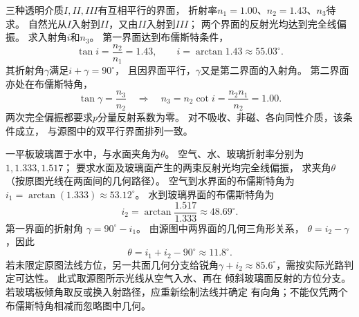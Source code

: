\problemtext 三种透明介质$I,II,III$有互相平行的界面，
折射率$n_1=1.00$、$n_2=1.43$、$n_3$待求。
自然光从$I$入射到$II$，又由$II$入射到$III$；
两个界面的反射光均达到完全线偏振。
求入射角$i$和$n_3$。
\workings
第一界面达到布儒斯特条件，
\[
 \tan i=\frac{n_2}{n_1}=1.43,\qquad
 \boxed{i=\arctan1.43\approx55.03^\circ}.
\]
其折射角$\gamma$满足$i+\gamma=90^\circ$，
且因界面平行，$\gamma$又是第二界面的入射角。
第二界面亦处在布儒斯特角，
\[
 \tan\gamma=\frac{n_3}{n_2}
 \quad\Longrightarrow\quad
 n_3=n_2\cot i
 =\frac{n_2n_1}{n_2}=\boxed{1.00}.
\]
\crosscheck 两次完全偏振都要求$p$分量反射系数为零。
对不吸收、非磁、各向同性介质，该条件成立，
与源图中的双平行界面排列一致。

\problemtext 一平板玻璃置于水中，与水面夹角为$\theta$。
空气、水、玻璃折射率分别为$1,1.333,1.517$；
要求水面及玻璃面产生的两束反射光均完全线偏振，
求夹角$\theta$（按原图光线在两面间的几何路径）。
\workings
空气到水界面的布儒斯特角为
$i_1=\arctan(1.333)\approx53.12^\circ$。
水到玻璃界面的布儒斯特角为
\[
 i_2=\arctan\frac{1.517}{1.333}\approx48.69^\circ.
\]
第一界面的折射角
$\gamma=90^\circ-i_1$。
由源图中两界面的几何三角形关系，
$\theta=i_2-\gamma$，因此
\[
 \boxed{\theta=i_1+i_2-90^\circ\approx11.8^\circ}.
\]
若未限定原图法线方位，另一共面几何分支给锐角$\gamma+i_2\approx85.6^\circ$，需按实际光路判定可达性。
\crosscheck 此式取源图所示光线从空气入水、再在
倾斜玻璃面反射的方位分支。
若玻璃板倾角取反或换入射路径，应重新绘制法线并确定
有向角；不能仅凭两个布儒斯特角相减而忽略图中几何。
